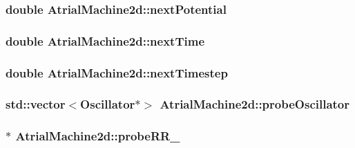 \hypertarget{class_atrial_machine2d_a50c29aa024f47633087f27e0f70607cf}{
\subsubsection[{next\+Potential}]{\setlength{\rightskip}{0pt plus 5cm}double Atrial\+Machine2d\+::next\+Potential}}\label{class_atrial_machine2d_a50c29aa024f47633087f27e0f70607cf}
\hypertarget{class_atrial_machine2d_a8f3931073e39c8c188d5ca65631b704b}{
\subsubsection[{next\+Time}]{\setlength{\rightskip}{0pt plus 5cm}double Atrial\+Machine2d\+::next\+Time}}\label{class_atrial_machine2d_a8f3931073e39c8c188d5ca65631b704b}
\hypertarget{class_atrial_machine2d_aa279d4e4ab1193bb6c358541d52424ff}{
\subsubsection[{next\+Timestep}]{\setlength{\rightskip}{0pt plus 5cm}double Atrial\+Machine2d\+::next\+Timestep}}\label{class_atrial_machine2d_aa279d4e4ab1193bb6c358541d52424ff}
\hypertarget{class_atrial_machine2d_a0f0e192be32cbbfa3f327cfe6e174f5e}{
\subsubsection[{probe\+Oscillator}]{\setlength{\rightskip}{0pt plus 5cm}std\+::vector$<${\bf Oscillator}$\ast$$>$ Atrial\+Machine2d\+::probe\+Oscillator}}\label{class_atrial_machine2d_a0f0e192be32cbbfa3f327cfe6e174f5e}
\hypertarget{class_atrial_machine2d_ae73cbdaac9845bd587afefab6c8c94fa}{
\subsubsection[{probe\+R\+R\+\_\+4}]{$\ast$ Atrial\+Machine2d\+::probe\+R\+R\+\_}}\label{class_atrial_machine2d_ae73cbdaac9845bd587afefab6c8c94fa}
